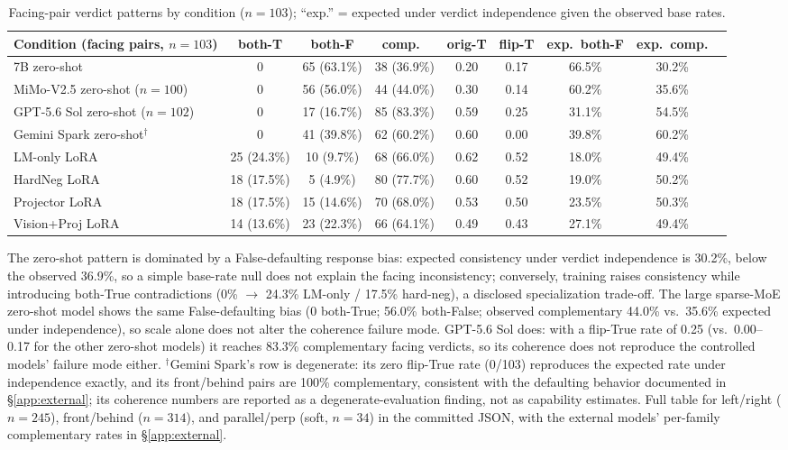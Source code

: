 \begin{table}[h]
\centering
\footnotesize
\caption{Facing-pair verdict patterns by condition ($n{=}103$); ``exp.'' =
expected under verdict independence given the observed base rates.}
\label{tab:verdicts}
\begin{tabular}{lcccccccc}
\toprule
Condition (facing pairs, $n{=}103$) & both-T & both-F & comp.\ & orig-T & flip-T & exp.\ both-F & exp.\ comp. \\
\midrule
7B zero-shot & 0 & 65 (63.1\%) & 38 (36.9\%) & 0.20 & 0.17 & 66.5\% & 30.2\% \\
MiMo-V2.5 zero-shot ($n{=}100$) & 0 & 56 (56.0\%) & 44 (44.0\%) & 0.30 & 0.14 & 60.2\% & 35.6\% \\
GPT-5.6 Sol zero-shot ($n{=}102$) & 0 & 17 (16.7\%) & 85 (83.3\%) & 0.59 & 0.25 & 31.1\% & 54.5\% \\
Gemini Spark zero-shot$^{\dagger}$ & 0 & 41 (39.8\%) & 62 (60.2\%) & 0.60 & 0.00 & 39.8\% & 60.2\% \\
LM-only LoRA & 25 (24.3\%) & 10 (9.7\%) & 68 (66.0\%) & 0.62 & 0.52 & 18.0\% & 49.4\% \\
HardNeg LoRA & 18 (17.5\%) & 5 (4.9\%) & 80 (77.7\%) & 0.60 & 0.52 & 19.0\% & 50.2\% \\
Projector LoRA & 18 (17.5\%) & 15 (14.6\%) & 70 (68.0\%) & 0.53 & 0.50 & 23.5\% & 50.3\% \\
Vision+Proj LoRA & 14 (13.6\%) & 23 (22.3\%) & 66 (64.1\%) & 0.49 & 0.43 & 27.1\% & 49.4\% \\
\bottomrule
\end{tabular}
\end{table}
The zero-shot pattern is dominated by a False-defaulting response bias:
expected consistency under verdict independence is 30.2\%, below the observed
36.9\%, so a simple base-rate null does not explain the facing inconsistency;
conversely, training raises consistency while introducing both-True
contradictions (0\% $\rightarrow$ 24.3\% LM-only / 17.5\% hard-neg), a
disclosed specialization trade-off. The large sparse-MoE zero-shot model shows
the same False-defaulting bias (0 both-True; 56.0\% both-False; observed
complementary 44.0\% vs.\ 35.6\% expected under independence), so scale alone
does not alter the coherence failure mode. GPT-5.6 Sol does: with a flip-True
rate of 0.25 (vs.\ 0.00--0.17 for the other zero-shot models) it reaches
83.3\% complementary facing verdicts, so its coherence does not reproduce the
controlled models' failure mode either. $^{\dagger}$Gemini Spark's row is
degenerate: its zero flip-True rate (0/103) reproduces the expected rate under
independence exactly, and its front/behind pairs are 100\% complementary,
consistent with the defaulting behavior documented in
\S\ref{app:external}; its coherence numbers are reported as a
degenerate-evaluation finding, not as capability estimates. Full table for
left/right ($n{=}245$), front/behind ($n{=}314$), and parallel/perp (soft,
$n{=}34$) in the committed JSON, with the external models' per-family
complementary rates in \S\ref{app:external}.

